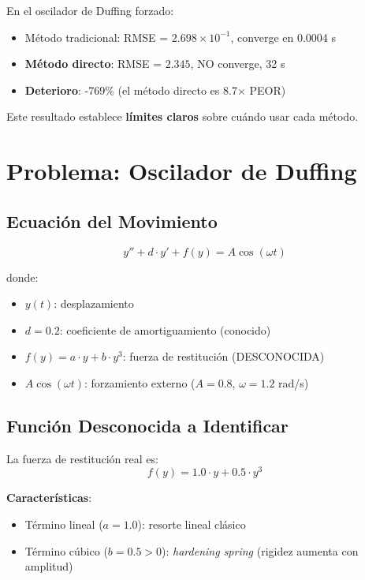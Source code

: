 \documentclass[11pt,a4paper]{article}
\begin{document}
En el oscilador de Duffing forzado:
\begin{itemize}
\item Método tradicional: RMSE = $2.698 \times 10^{-1}$, converge en 0.0004 s
\item \textbf{Método directo}: RMSE = $2.345$, NO converge, 32 s
\item \textbf{Deterioro}: -769\% (el método directo es 8.7$\times$ PEOR)
\end{itemize}

Este resultado establece \textbf{límites claros} sobre cuándo usar cada método.

\section{Problema: Oscilador de Duffing}

\subsection{Ecuación del Movimiento}

\begin{equation}
y'' + d \cdot y' + f(y) = A \cos(\omega t)
\end{equation}

donde:
\begin{itemize}
\item $y(t)$: desplazamiento
\item $d = 0.2$: coeficiente de amortiguamiento (conocido)
\item $f(y) = a \cdot y + b \cdot y^3$: fuerza de restitución (DESCONOCIDA)
\item $A \cos(\omega t)$: forzamiento externo ($A = 0.8$, $\omega = 1.2$ rad/s)
\end{itemize}

\subsection{Función Desconocida a Identificar}

La fuerza de restitución real es:
\begin{equation}
f(y) = 1.0 \cdot y + 0.5 \cdot y^3
\end{equation}

\textbf{Características}:
\begin{itemize}
\item Término lineal ($a = 1.0$): resorte lineal clásico
\item Término cúbico ($b = 0.5 > 0$): \textit{hardening spring} (rigidez aumenta con amplitud)
\end{itemize}
\end{document}
